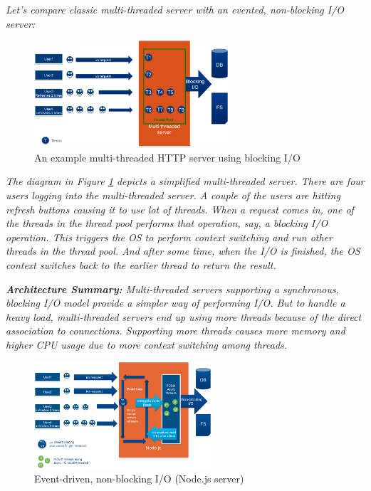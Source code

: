 \textit{Let's compare classic multi-threaded server with an evented, non-blocking I/O server:}

\begin{figure}[H]
\centering %
\includegraphics[height=150px]{img/multiThreadedServer.png}
\caption{An example multi-threaded HTTP server using blocking I/O}
\label{fig:multiThreadedServer}
\end{figure}

\textit{The diagram in Figure \ref{fig:multiThreadedServer} depicts a simplified multi-threaded server. There are four users logging into the multi-threaded server. A couple of the users are hitting refresh buttons causing it to use lot of threads. When a request comes in, one of the threads in the thread pool performs that operation, say, a blocking I/O operation. This triggers the OS to perform context switching and run other threads in the thread pool. And after some time, when the I/O is finished, the OS context switches back to the earlier thread to return the result.}

\textit{\textbf{Architecture Summary:} Multi-threaded servers supporting a synchronous, blocking I/O model provide a simpler way of performing I/O. But to handle a heavy load, multi-threaded servers end up using more threads because of the direct association to connections. Supporting more threads causes more memory and higher CPU usage due to more context switching among threads.}

\begin{figure}[H]
\centering %
\includegraphics[height=150px]{img/NodeJS-EventedIOAsyncIO_latest.png}
\caption{Event-driven, non-blocking I/O (Node.js server)}
\label{fig:nodejsServer}
\end{figure}

